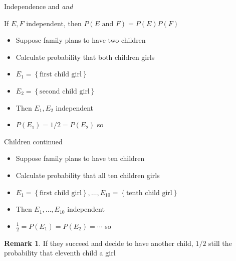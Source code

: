 \documentclass[handout]{beamer}
\theoremstyle{definition}
\newtheorem{remark}{Remark}
\begin{document}
\begin{frame}{Independence and \em{and}}
\begin{theorem}
If $E,F$ independent, then
$P\left(\text{$E$ and $F$}\right)=P\left(E\right)P\left(F\right)$
\end{theorem}
\begin{example}
\begin{itemize}
\item Suppose family plans to have two children
\item Calculate probability that both children girls
\item $E_1=\left\{\text{first child girl}\right\}$
\item $E_2=\left\{\text{second child girl}\right\}$
\item Then $E_1,E_2$ independent
\item $P\left(E_1\right)=1/2=P\left(E_2\right)$ so
\end{itemize}
\end{example}
\end{frame}

\begin{frame}{Children continued}
\begin{itemize}
\item Suppose family plans to have \alert{ten} children
\item Calculate probability that all ten children girls
\item $E_1=\left\{\text{first child girl}\right\},\ldots,
E_{10}=\left\{\text{tenth child girl}\right\}$
\item Then $E_1,\ldots,E_{10}$ independent
\item $\frac{1}{2}=P\left(E_1\right)=P\left(E_2\right)=\cdots$ so
\end{itemize}
\begin{remark}
If they succeed and decide to have another child,
$1/2$ still the probability that eleventh child a girl
\end{remark}
\end{frame}
\end{document}
